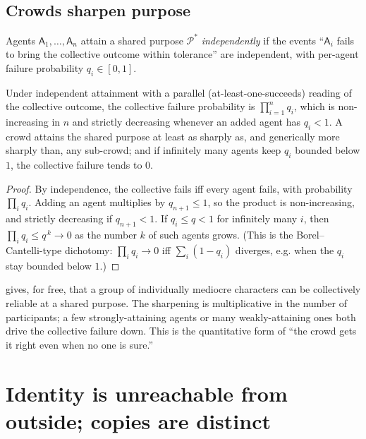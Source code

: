 \documentclass[11pt,twocolumn,a4paper]{article}
\newcommand{\Agent}{\mathsf{A}}
\newcommand{\Purp}{\mathcal{P}}      %
\begin{document}
\subsection{Crowds sharpen purpose}

\begin{definition}
\label{def:indep}
Agents $\Agent_1,\dots,\Agent_n$ attain a shared purpose $\Purp^\ast$
\emph{independently} if the events ``$\Agent_i$ fails to bring the
collective outcome within tolerance'' are independent, with per-agent
failure probability $q_i\in[0,1]$.
\end{definition}

\begin{theorem}
\label{thm:crowd}
Under independent attainment with a parallel (at-least-one-succeeds)
reading of the collective outcome, the collective failure probability is
$\prod_{i=1}^n q_i$, which is non-increasing in $n$ and strictly
decreasing whenever an added agent has $q_i<1$. A crowd attains the shared
purpose at least as sharply as, and generically more sharply than, any
sub-crowd; and if infinitely many agents keep $q_i$ bounded below $1$, the
collective failure tends to $0$.
\end{theorem}

\begin{proof}
By independence, the collective fails iff every agent fails, with
probability $\prod_i q_i$. Adding an agent multiplies by $q_{n+1}\le1$, so
the product is non-increasing, and strictly decreasing if $q_{n+1}<1$. If
$q_i\le q<1$ for infinitely many $i$, then $\prod_i q_i\le q^{\,k}\to0$ as
the number $k$ of such agents grows. (This is the Borel--Cantelli-type
dichotomy: $\prod_i q_i\to0$ iff $\sum_i(1-q_i)$ diverges, e.g. when the
$q_i$ stay bounded below $1$.)
\end{proof}

\begin{remark}
 gives, for free, that a group of individually mediocre
characters can be collectively reliable at a shared purpose. The
sharpening is multiplicative in the number of participants; a
few strongly-attaining agents or many weakly-attaining ones both drive the
collective failure down. This is the quantitative form of ``the crowd gets
it right even when no one is sure.''
\end{remark}

\section{Identity is unreachable from outside; copies are distinct}
\label{sec:unreachable}
\end{document}
